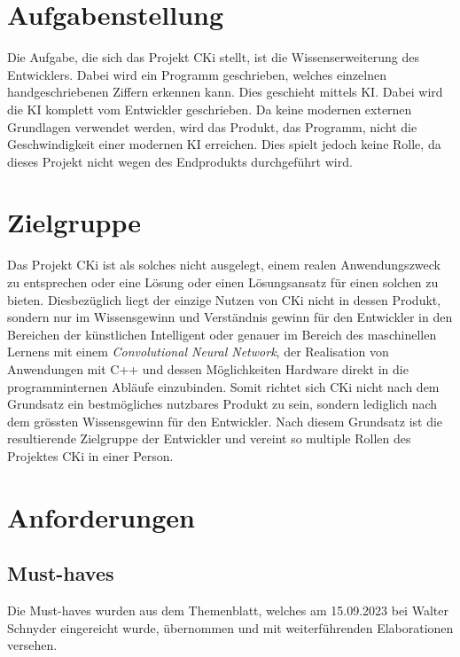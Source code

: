\section{Aufgabenstellung}
\label{sec:AnalyseAufgabenstellung}
Die Aufgabe, die sich das Projekt CKi stellt, ist die Wissenserweiterung des Entwicklers. Dabei wird ein Programm geschrieben, welches einzelnen handgeschriebenen Ziffern erkennen kann. Dies geschieht mittels KI. Dabei wird die KI komplett vom Entwickler geschrieben. Da keine modernen externen Grundlagen verwendet werden, wird das Produkt, das Programm, nicht die Geschwindigkeit einer modernen KI erreichen. Dies spielt jedoch keine Rolle, da dieses Projekt nicht wegen des Endprodukts durchgeführt wird.

\section{Zielgruppe}
\label{sec:AnalyseZielgruppe}
Das Projekt CKi ist als solches nicht ausgelegt, einem realen Anwendungszweck zu entsprechen oder eine Lösung oder einen Lösungsansatz für einen solchen zu bieten. Diesbezüglich liegt der einzige Nutzen von CKi nicht in dessen Produkt, sondern nur im Wissensgewinn und Verständnis gewinn für den Entwickler in den Bereichen der künstlichen Intelligent oder genauer im Bereich des maschinellen Lernens mit einem \textit{Convolutional Neural Network}, der Realisation von Anwendungen mit C++ und dessen Möglichkeiten Hardware direkt in die programminternen Abläufe einzubinden. Somit richtet sich CKi nicht nach dem Grundsatz ein bestmögliches nutzbares Produkt zu sein, sondern lediglich nach dem grössten Wissensgewinn für den Entwickler. Nach diesem Grundsatz ist die resultierende Zielgruppe der Entwickler und vereint so multiple Rollen des Projektes CKi in einer Person.

\section{Anforderungen}
\label{sec:AnalyseAnforderungen}

\subsection{Must-haves}
\label{sec:AnalyseMustHaveS}
Die Must-haves wurden aus dem Themenblatt, welches am 15.09.2023 bei Walter Schnyder eingereicht wurde, übernommen und mit weiterführenden Elaborationen versehen.

